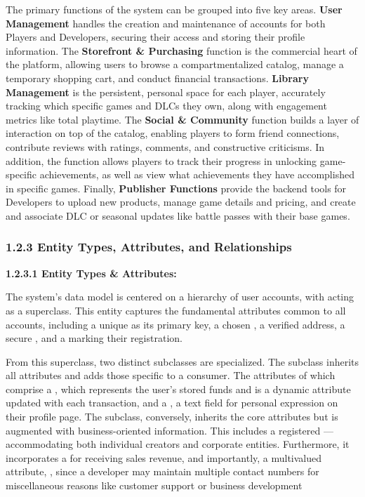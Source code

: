 The primary functions of the system can be grouped into five key areas. \textbf{User Management} handles the creation and maintenance of accounts for both Players and Developers, securing their access and storing their profile information. The \textbf{Storefront \& Purchasing} function is the commercial heart of the platform, allowing users to browse a compartmentalized catalog, manage a temporary shopping cart, and conduct financial transactions. \textbf{Library Management} is the persistent, personal space for each player, accurately tracking which specific games and DLCs they own, along with engagement metrics like total playtime. The \textbf{Social \& Community} function builds a layer of interaction on top of the catalog, enabling players to form friend connections, contribute reviews with ratings, comments, and constructive criticisms. In addition, the function allows players to track their progress in unlocking game-specific achievements, as well as view what achievements they have accomplished in specific games. Finally, \textbf{Publisher Functions} provide the backend tools for Developers to upload new products, manage game details and pricing, and create and associate DLC or seasonal updates like battle passes with their base games.

\subsubsection*{1.2.3 Entity Types, Attributes, and Relationships}

\noindent\textbf{1.2.3.1 Entity Types \& Attributes:}

The system's data model is centered on a hierarchy of user accounts, with  acting as a superclass. This entity captures the fundamental attributes common to all accounts, including a unique  as its primary key, a chosen , a verified  address, a secure , and a  marking their registration.

From this superclass, two distinct subclasses are specialized. The  subclass inherits all  attributes and adds those specific to a consumer. The attributes of which comprise a , which represents the user's stored funds and is a dynamic attribute updated with each transaction, and a , a text field for personal expression on their profile page. The  subclass, conversely, inherits the core  attributes but is augmented with business-oriented information. This includes a registered ---accommodating both individual creators and corporate entities. Furthermore, it incorporates a  for receiving sales revenue, and importantly, a multivalued attribute, , since a developer may maintain multiple contact numbers for miscellaneous reasons like customer support or business development

